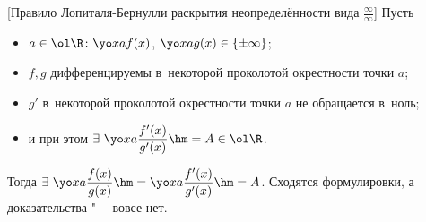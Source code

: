 [Правило Лопиталя-Бернулли раскрытия неопределённости вида
$\frac{\infty}{\infty}$]\label{Lop2}
 Пусть 
 \begin{itemize}
   \item $a\in\ol\R\colon \yo xaf(x)$, ${\yo xag(x)\in\{\pm\infty\}}$;
   \item $f,g$ дифференцируемы в~некоторой проколотой окрестности точки $a$;
   \item $g'$ в~некоторой проколотой окрестности точки $a$ не обращается в~ноль;
   \item и при этом $\exists\ \yo xa\dfrac{f'(x)}{g'(x)}\hm=A\in\ol\R$. 
\end{itemize}
Тогда $\exists\ \yo xa\dfrac{f(x)}{g(x)}\hm=\yo xa\dfrac{f'(x)}{g'(x)}\hm=A$. Сходятся формулировки, а
доказательства "--- вовсе нет.
